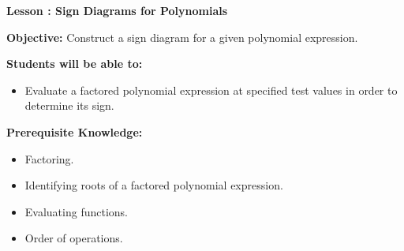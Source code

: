 \documentclass[12pt]{article}
\theoremstyle{definition}
\begin{document}
{\bf \large Lesson : Sign Diagrams for Polynomials}
\hfill \doclicenseImage[imagewidth=5em]\\
\par
{\bf Objective:} Construct a sign diagram for a given polynomial expression.\\
\par
{\bf Students will be able to:}
\begin{itemize}
	\item Evaluate a factored polynomial expression at specified test values in order to determine its sign.
\end{itemize}
{\bf Prerequisite Knowledge:}
\begin{itemize}
	\item Factoring.
	\item Identifying roots of a factored polynomial expression.
	\item Evaluating functions.
	\item Order of operations.
\end{itemize}
\hrulefill
\end{document}
